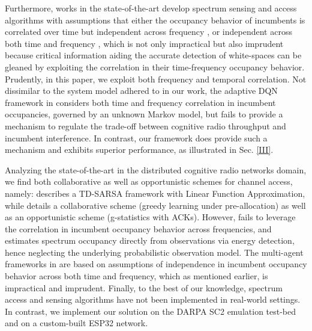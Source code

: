 \documentclass[12pt, draftcls, onecolumn]{IEEEtran}
\begin{document}
Furthermore, works in the state-of-the-art develop spectrum sensing and access algorithms with assumptions that either the occupancy behavior of incumbents is correlated over time but independent across frequency \cite{WCL:5, WCL:6}, or independent across both time and frequency \cite{WCL:4, WCL:9, WCL:10, WCL:8, WCL:3, WCL:11}, which is not only impractical but also imprudent because critical information aiding the accurate detection of white-spaces can be gleaned by exploiting the correlation in their time-frequency occupancy behavior. Prudently, in this paper, we exploit both frequency and temporal correlation. Not dissimilar to the system model adhered to in our work, the adaptive DQN framework in \cite{WCL:DQN} considers both time and frequency correlation in incumbent occupancies, governed by an unknown Markov model, but fails to provide a mechanism  to regulate the trade-off between cognitive radio throughput and incumbent interference. In contrast, our framework does provide such a mechanism and exhibits superior performance, as illustrated in Sec. \ref{III}.

Analyzing the state-of-the-art in the distributed cognitive radio networks domain, we find both collaborative as well as opportunistic schemes for channel access, namely: \cite{WCL:5} describes a TD-SARSA framework with Linear Function Approximation, while \cite{WCL:MIT} details a collaborative scheme (greedy learning under pre-allocation) as well as an opportunistic scheme (g-statistics with ACKs). However, \cite{WCL:5} fails to leverage the correlation in incumbent occupancy behavior across frequencies, and estimates spectrum occupancy directly from observations via energy detection, hence neglecting the underlying probabilistic observation model. The multi-agent frameworks in \cite{WCL:MIT} are based on assumptions of independence in incumbent occupancy behavior across both time and frequency, which as mentioned earlier, is impractical and imprudent.
Finally, to the best of our knowledge, spectrum access and sensing algorithms have not been implemented in real-world settings. In contrast, we implement our solution on the DARPA SC2 emulation test-bed and on a custom-built ESP32 network.
\end{document}
